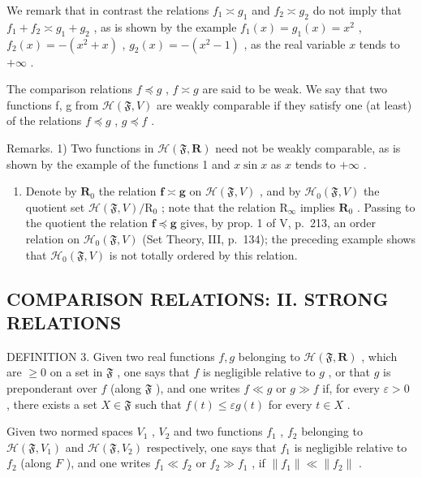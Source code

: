 We remark that in contrast the relations \(f_{1} \asymp g_{1}\) and \(f_{2} \asymp g_{2}\) do not imply that \(f_{1} + f_{2} \asymp g_{1} + g_{2}\) , as is shown by the example \(f_{1}(x) = g_{1}(x) = x^{2}\) , \(f_{2}(x) = -(x^{2} + x)\) , \(g_{2}(x) = -(x^{2} - 1)\) , as the real variable \(x\) tends to \(+\infty\) .

The comparison relations \(f \preccurlyeq g\) , \(f \asymp g\) are said to be weak. We say that two functions f, g from \(\mathcal{H}(\mathfrak{F}, V)\) are weakly comparable if they satisfy one (at least) of the relations \(f \preccurlyeq g\) , \(g \preccurlyeq f\) .

Remarks. 1) Two functions in \(\mathcal{H}(\mathfrak{F},\mathbf{R})\) need not be weakly comparable, as is shown by the example of the functions 1 and \(x\sin x\) as \(x\) tends to \(+\infty\) .

\begin{enumerate}
\def\labelenumi{\arabic{enumi})}
\setcounter{enumi}{1}
\tightlist
\item
  Denote by \(\mathbf{R}_0\) the relation \(\mathbf{f} \asymp \mathbf{g}\) on \(\mathcal{H}(\mathfrak{F}, V)\) , and by \(\mathcal{H}_0(\mathfrak{F}, V)\) the quotient set \(\mathcal{H}(\mathfrak{F}, V)/\mathrm{R}_0\) ; note that the relation \(\mathrm{R}_{\infty}\) implies \(\mathbf{R}_0\) . Passing to the quotient the relation \(\mathbf{f} \preccurlyeq \mathbf{g}\) gives, by prop. 1 of V, p.~213, an order relation on \(\mathcal{H}_0(\mathfrak{F}, V)\) (Set Theory, III, p.~134); the preceding example shows that \(\mathcal{H}_0(\mathfrak{F}, V)\) is not totally ordered by this relation.
\end{enumerate}

\subsection{COMPARISON RELATIONS: II. STRONG RELATIONS}

DEFINITION 3. Given two real functions \(f, g\) belonging to \(\mathcal{H}(\mathfrak{F}, \mathbf{R})\) , which are \(\geqslant 0\) on a set in \(\mathfrak{F}\) , one says that \(f\) is negligible relative to \(g\) , or that \(g\) is preponderant over \(f\) (along \(\mathfrak{F}\) ), and one writes \(f \ll g\) or \(g \gg f\) if, for every \(\varepsilon > 0\) , there exists a set \(X \in \mathfrak{F}\) such that \(f(t) \leqslant \varepsilon g(t)\) for every \(t \in X\) .

Given two normed spaces \(V_{1}\) , \(V_{2}\) and two functions \(f_{1}\) , \(f_{2}\) belonging to \(\mathcal{H}(\mathfrak{F}, V_{1})\) and \(\mathcal{H}(\mathfrak{F}, V_{2})\) respectively, one says that \(f_{1}\) is negligible relative to \(f_{2}\) (along \(F\) ), and one writes \(f_{1} \ll f_{2}\) or \(f_{2} \gg f_{1}\) , if \(\|f_{1}\| \ll \|f_{2}\|\) .


